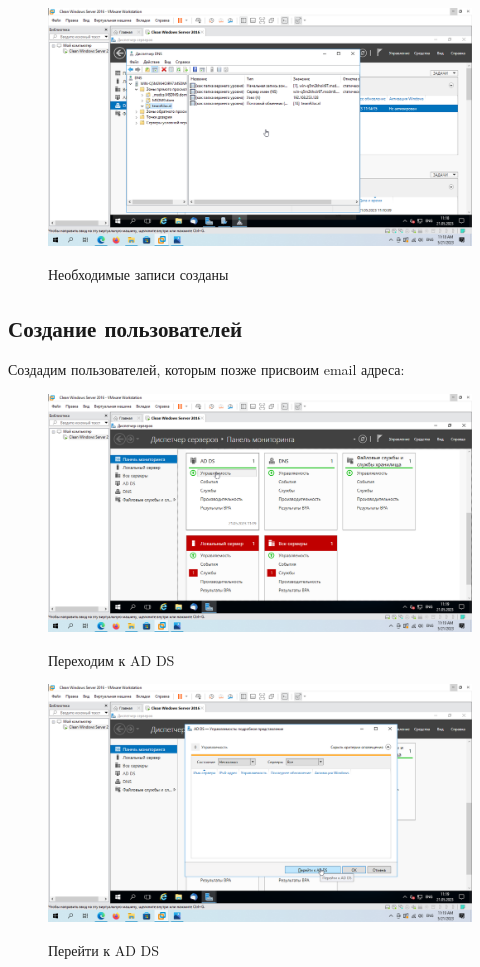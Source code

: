 \documentclass[a4paper]{article}
\begin{document}
  \begin{figure}[H]
    \centering
    \includegraphics[width=\textwidth]{11_0093}
    \label{img:93}
    \caption{Необходимые записи созданы}
  \end{figure}

  \subsection{Создание пользователей}

  Создадим пользователей, которым позже присвоим email адреса:

  \begin{figure}[H]
    \centering
    \includegraphics[width=\textwidth]{11_0094}
    \label{img:94}
    \caption{Переходим к AD DS}
  \end{figure}

  \begin{figure}[H]
    \centering
    \includegraphics[width=\textwidth]{11_0095}
    \label{img:95}
    \caption{Перейти к AD DS}
  \end{figure}
\end{document}
